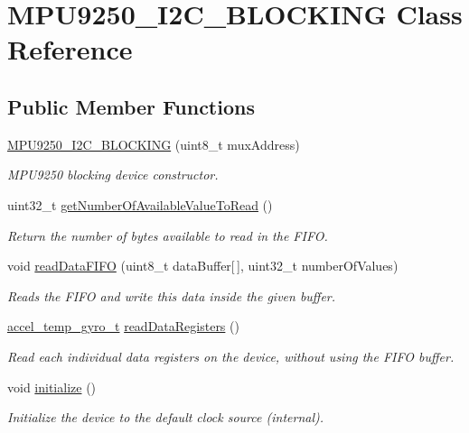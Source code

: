 \hypertarget{class_m_p_u9250___i2_c___b_l_o_c_k_i_n_g}{}\section{M\+P\+U9250\+\_\+\+I2\+C\+\_\+\+B\+L\+O\+C\+K\+I\+NG Class Reference}
\label{class_m_p_u9250___i2_c___b_l_o_c_k_i_n_g}
\subsection*{Public Member Functions}
\begin{DoxyCompactItemize}
\item 
\hyperlink{class_m_p_u9250___i2_c___b_l_o_c_k_i_n_g_abf6babd04cf304457892bc2c7e4cb311}{M\+P\+U9250\+\_\+\+I2\+C\+\_\+\+B\+L\+O\+C\+K\+I\+NG} (uint8\+\_\+t mux\+Address)
\begin{DoxyCompactList}\small\item\em M\+P\+U9250 blocking device constructor. \end{DoxyCompactList}\item 
uint32\+\_\+t \hyperlink{class_m_p_u9250___i2_c___b_l_o_c_k_i_n_g_a9ed89f6c7a10ca407cb1a3bbcd81137e}{get\+Number\+Of\+Available\+Value\+To\+Read} ()
\begin{DoxyCompactList}\small\item\em Return the number of bytes available to read in the F\+I\+FO. \end{DoxyCompactList}\item 
void \hyperlink{class_m_p_u9250___i2_c___b_l_o_c_k_i_n_g_a8db776173eeac2ea5551cd736ced6427}{read\+Data\+F\+I\+FO} (uint8\+\_\+t data\+Buffer\mbox{[}$\,$\mbox{]}, uint32\+\_\+t number\+Of\+Values)
\begin{DoxyCompactList}\small\item\em Reads the F\+I\+FO and write this data inside the given buffer. \end{DoxyCompactList}\item 
\hyperlink{unionaccel__temp__gyro__t}{accel\+\_\+temp\+\_\+gyro\+\_\+t} \hyperlink{class_m_p_u9250___i2_c___b_l_o_c_k_i_n_g_a8622a72cd6910d10938f30d1003e39d2}{read\+Data\+Registers} ()
\begin{DoxyCompactList}\small\item\em Read each individual data registers on the device, without using the F\+I\+FO buffer. \end{DoxyCompactList}\item 
void \hyperlink{class_m_p_u9250___i2_c___b_l_o_c_k_i_n_g_a871c842c9e1a05b345e358f314597d97}{initialize} ()
\begin{DoxyCompactList}\small\item\em Initialize the device to the default clock source (internal). \end{DoxyCompactList}\end{DoxyCompactItemize}



